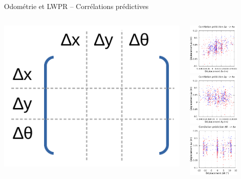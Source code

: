 \begin{frame}[noframenumbering]{Odométrie et LWPR -- Corrélations prédictives}
    \begin{columns}
        \begin{column}{0.35\linewidth}
            \includegraphics[type=pdf,ext=.pdf,read=.pdf,width=0.8\linewidth]{../schema/correlation_matrix}
        \end{column}
        \begin{column}{0.65\linewidth}
            \includegraphics[type=pdf,ext=.pdf,read=.pdf,width=2.5cm]{../plot/OdometryLWPR/grass_close_function_goal_x_x}
            \includegraphics[type=pdf,ext=.pdf,read=.pdf,width=2.5cm]{../plot/OdometryLWPR/grass_close_function_goal_y_x}
            \includegraphics[type=pdf,ext=.pdf,read=.pdf,width=2.5cm]{../plot/OdometryLWPR/grass_close_function_goal_yaw_x}
            \vspace{0.2cm}

\end{column}
\end{columns}
\end{frame}
